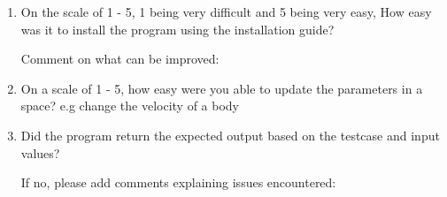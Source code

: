 \documentclass[12pt, titlepage]{article}
\begin{document}
\begin{enumerate}

\item {On the scale of 1 - 5, 1 being very difficult and 5 being very easy, How easy was it to install the program using the installation guide?

Comment on what can be improved:}

\item On a scale of 1 - 5, how easy were you able to update the parameters in a space? e.g change the velocity of a body

\item Did the program return the expected output based on the testcase and input values? 

If no, please add comments explaining issues encountered:


\end{enumerate}
\end{document}
